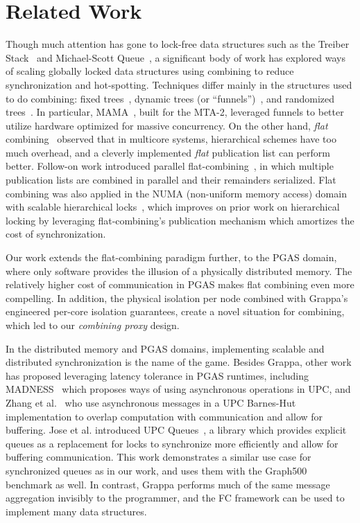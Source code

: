 \section{Related Work}
Though much attention has gone to lock-free data structures such as the Treiber Stack~\cite{treiber} and Michael-Scott Queue~\cite{msqueue}, a significant body of work has explored ways of scaling globally locked data structures using combining to reduce synchronization and hot-spotting.
Techniques differ mainly in the structures used to do combining: fixed trees~\cite{yew:combining-trees}, dynamic trees (or ``funnels'')~\cite{funnels,MAMA}, and randomized trees~\cite{edtrees}. In particular, MAMA~\cite{MAMA}, built for the MTA-2, leveraged funnels to better utilize hardware optimized for massive concurrency.
On the other hand, \emph{flat} combining~\cite{flatCombining} observed that in multicore systems, hierarchical schemes have too much overhead, and a cleverly implemented \emph{flat} publication list can perform better.
Follow-on work introduced parallel flat-combining~\cite{scalableFCQueues}, in which multiple publication lists are combined in parallel and their remainders serialized.
Flat combining was also applied in the NUMA (non-uniform memory access) domain with scalable hierarchical locks~\cite{fcNUMALocks}, which improves on prior work on hierarchical locking by leveraging flat-combining's publication mechanism which amortizes the cost of synchronization.

Our work extends the flat-combining paradigm further, to the PGAS domain, where only software provides the illusion of a physically distributed memory. The relatively higher cost of communication in PGAS makes flat combining even more compelling. In addition, the physical isolation per node combined with Grappa's engineered per-core isolation guarantees, create a novel situation for combining, which led to our \emph{combining proxy} design.

In the distributed memory and PGAS domains, implementing scalable and distributed synchronization is the name of the game.
Besides Grappa, other work has proposed leveraging latency tolerance in PGAS runtimes, including MADNESS~\cite{shet:async-upc} which proposes ways of using asynchronous operations in UPC, and Zhang et al.~\cite{zhang:barnes-hut} who use asynchronous messages in a UPC Barnes-Hut implementation to overlap computation with communication and allow for buffering.
Jose et al. introduced UPC Queues~\cite{jose:upc-queues}, a library which provides explicit queues as a replacement for locks to synchronize more efficiently and allow for buffering communication. This work demonstrates a similar use case for synchronized queues as in our work, and uses them with the Graph500 benchmark as well. In contrast, Grappa performs much of the same message aggregation invisibly to the programmer, and the FC framework can be used to implement many data structures.

